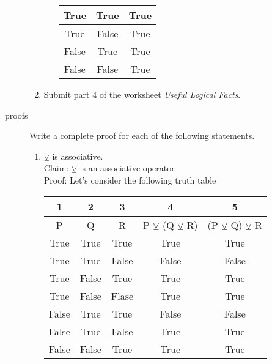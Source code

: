 \documentclass{letter}
\begin{document}
\begin{description}
\begin{enumerate}
\begin{enumerate}
\begin{center}
\begin{tabular}{||c|c|c||}
                                    True & True & True \\ \hline
                                    True & False & True \\ \hline
                                    False & True & True \\ \hline
                                    False & False & True \\ \hline
                                    \end{tabular}
                                    \end{center}
			\end{enumerate}
	\item Submit part 4 of the worksheet {\em Useful Logical Facts}.
\end{enumerate}
\item[proofs] Write a complete proof for each of the following statements.
	\begin{enumerate}
		\item $\veebar$ is associative. \\
                  Claim: $\veebar$ is an associative operator \\
                  Proof: Let's consider the following truth table \\
                  \begin{center}
                                    \begin{tabular}{||c|c|c|c|c||}
                                      1 & 2 & 3 & 4 & 5 \\
                                    \hline
                                    P & Q & R & P $\veebar$ (Q $\veebar$ R) & (P $\veebar$ Q) $\veebar$ R\\ \hline
                                    True & True & True & True & True\\ \hline
                                    True & True & False & False & False\\ \hline
                                    True & False & True & True & True\\ \hline
                                    True & False & Flase & True & True\\ \hline
                                    False & True & True & False & False\\ \hline
                                    False & True & False & True & True\\ \hline
                                    False & False & True  & True & True\\ \hline

\end{tabular}
\end{center}
\end{enumerate}
\end{description}
\end{document}
